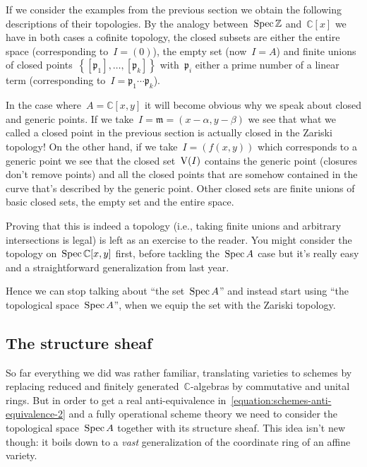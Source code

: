 If we consider the examples from the previous section we obtain the following descriptions of their topologies. By the analogy between~$\operatorname{Spec}\mathbb{Z}$ and~$\mathbb{C}[x]$ we have in both cases a cofinite topology, the closed subsets are either the entire space (corresponding to~$I=(0)$), the empty set (now~$I=A$) and finite unions of closed points~$\left\{ [\mathfrak{p}_1],\ldots,[\mathfrak{p}_k] \right\}$ with~$\mathfrak{p}_i$ either a prime number of a linear term (corresponding to~$I=\mathfrak{p}_1\cdots\mathfrak{p}_k$).

In the case where~$A=\mathbb{C}[x,y]$ it will become obvious why we speak about closed and generic points. If we take~$I=\mathfrak{m}=(x-\alpha,y-\beta)$ we see that what we called a closed point in the previous section is actually closed in the Zariski topology! On the other hand, if we take~$I=(f(x,y))$ which corresponds to a generic point we see that the closed set~$\operatorname{V}(I)$ contains the generic point (closures don't remove points) and all the closed points that are somehow contained in the curve that's described by the generic point. Other closed sets are finite unions of basic closed sets, the empty set and the entire space.

Proving that this is indeed a topology (i.e., taking finite unions and arbitrary intersections is legal) is left as an exercise to the reader. You might consider the topology on~$\operatorname{Spec}\mathbb{C}[x,y]$ first, before tackling the~$\operatorname{Spec} A$ case but it's really easy and a straightforward generalization from last year.

Hence we can stop talking about ``the set~$\operatorname{Spec} A$'' and instead start using ``the topological space~$\operatorname{Spec} A$'', when we equip the set with the Zariski topology.


\subsection{The structure sheaf}
So far everything we did was rather familiar, translating varieties to schemes by replacing reduced and finitely generated~$\mathbb{C}$-algebras by commutative and unital rings. But in order to get a real anti-equivalence in~\eqref{equation:schemes-anti-equivalence-2} and a fully operational scheme theory we need to consider the topological space~$\operatorname{Spec} A$ together with its structure sheaf. This idea isn't new though: it boils down to a \emph{vast} generalization of the coordinate ring of an affine variety.

